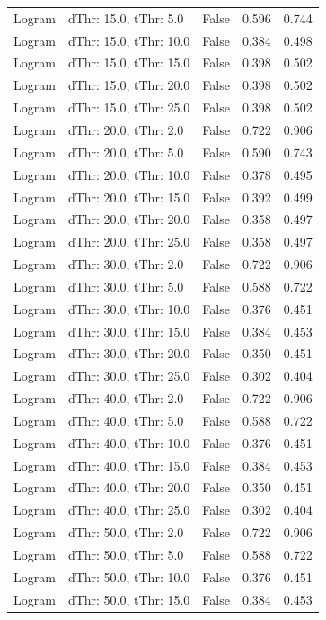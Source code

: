 \begin{small}
\begin{longtable}{llccc}
Logram & dThr: 15.0, tThr: 5.0 & False & 0.596 & 0.744 \\
Logram & dThr: 15.0, tThr: 10.0 & False & 0.384 & 0.498 \\
Logram & dThr: 15.0, tThr: 15.0 & False & 0.398 & 0.502 \\
Logram & dThr: 15.0, tThr: 20.0 & False & 0.398 & 0.502 \\
Logram & dThr: 15.0, tThr: 25.0 & False & 0.398 & 0.502 \\
Logram & dThr: 20.0, tThr: 2.0 & False & 0.722 & 0.906 \\
Logram & dThr: 20.0, tThr: 5.0 & False & 0.590 & 0.743 \\
Logram & dThr: 20.0, tThr: 10.0 & False & 0.378 & 0.495 \\
Logram & dThr: 20.0, tThr: 15.0 & False & 0.392 & 0.499 \\
Logram & dThr: 20.0, tThr: 20.0 & False & 0.358 & 0.497 \\
Logram & dThr: 20.0, tThr: 25.0 & False & 0.358 & 0.497 \\
Logram & dThr: 30.0, tThr: 2.0 & False & 0.722 & 0.906 \\
Logram & dThr: 30.0, tThr: 5.0 & False & 0.588 & 0.722 \\
Logram & dThr: 30.0, tThr: 10.0 & False & 0.376 & 0.451 \\
Logram & dThr: 30.0, tThr: 15.0 & False & 0.384 & 0.453 \\
Logram & dThr: 30.0, tThr: 20.0 & False & 0.350 & 0.451 \\
Logram & dThr: 30.0, tThr: 25.0 & False & 0.302 & 0.404 \\
Logram & dThr: 40.0, tThr: 2.0 & False & 0.722 & 0.906 \\
Logram & dThr: 40.0, tThr: 5.0 & False & 0.588 & 0.722 \\
Logram & dThr: 40.0, tThr: 10.0 & False & 0.376 & 0.451 \\
Logram & dThr: 40.0, tThr: 15.0 & False & 0.384 & 0.453 \\
Logram & dThr: 40.0, tThr: 20.0 & False & 0.350 & 0.451 \\
Logram & dThr: 40.0, tThr: 25.0 & False & 0.302 & 0.404 \\
Logram & dThr: 50.0, tThr: 2.0 & False & 0.722 & 0.906 \\
Logram & dThr: 50.0, tThr: 5.0 & False & 0.588 & 0.722 \\
Logram & dThr: 50.0, tThr: 10.0 & False & 0.376 & 0.451 \\
Logram & dThr: 50.0, tThr: 15.0 & False & 0.384 & 0.453 \\

\end{longtable}
\end{small}
